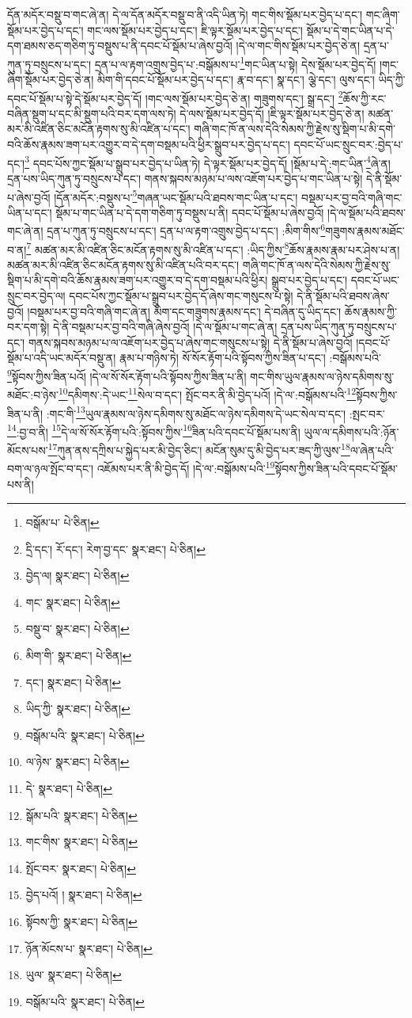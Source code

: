 དོན་མདོར་བསྡུ་བ་གང་ཞེ་ན། དེ་ལ་དོན་མདོར་བསྡུ་བ་ནི་འདི་ཡིན་ཏེ། གང་གིས་སྡོམ་པར་བྱེད་པ་དང་། གང་ཞིག་སྡོམ་པར་བྱེད་པ་དང་། གང་ལས་སྡོམ་པར་བྱེད་པ་དང་། ཇི་ལྟར་སྡོམ་པར་བྱེད་པ་དང་། སྡོམ་པ་དེ་གང་ཡིན་པ་དེ་དག་ཐམས་ཅད་གཅིག་ཏུ་བསྡུས་པ་ནི་དབང་པོ་སྡོམ་པ་ཞེས་བྱའོ། །དེ་ལ་གང་གིས་སྡོམ་པར་བྱེད་ཅེ་ན། དྲན་པ་ཀུན་ཏུ་བསྲུངས་པ་དང་། དྲན་པ་ལ་རྟག་འགྲུས་བྱེད་པ་:བསྒོམས་པ་\footnote{བསྒོམ་པ་  པེ་ཅིན། }གང་ཡིན་པ་སྟེ། དེས་སྡོམ་པར་བྱེད་དོ། །གང་ཞིག་སྡོམ་པར་བྱེད་ཅེ་ན། མིག་གི་དབང་པོ་སྡོམ་པར་བྱེད་པ་དང་། རྣ་བ་དང་། སྣ་དང་། ལྕེ་དང་། ལུས་དང་། ཡིད་ཀྱི་དབང་པོ་སྡོམ་པ་སྟེ་དེ་སྡོམ་པར་བྱེད་དོ། །གང་ལས་སྡོམ་པར་བྱེད་ཅེ་ན། གཟུགས་དང་། སྒྲ་དང་། \footnote{དྲི་དང་། རོ་དང་། རེག་བྱ་དང་  སྣར་ཐང་།  པེ་ཅིན། }ཆོས་ཀྱི་རང་བཞིན་སྡུག་པ་དང་མི་སྡུག་པའི་བར་དག་ལས་ཏེ། དེ་ལས་སྡོམ་པར་བྱེད་དོ། །ཇི་ལྟར་སྡོམ་པར་བྱེད་ཅེ་ན། མཚན་མར་མི་འཛིན་ཅིང་མངོན་རྟགས་སུ་མི་འཛིན་པ་དང་། གཞི་གང་ཁོ་ན་ལས་དེའི་སེམས་ཀྱི་རྗེས་སུ་སྡིག་པ་མི་དགེ་བའི་ཆོས་རྣམས་ཟག་པར་འགྱུར་བ་དེ་དག་བསྡམ་པའི་ཕྱིར་སྒྲུབ་པར་བྱེད་པ་དང་། དབང་པོ་ཡང་སྲུང་བར་:བྱེད་པ་དང་།\footnote{བྱེད་ལ།  སྣར་ཐང་།  པེ་ཅིན། } དབང་པོས་ཀྱང་སྡོམ་པ་སྒྲུབ་པར་བྱེད་པ་ཡིན་ཏེ། དེ་ལྟར་སྡོམ་པར་བྱེད་དོ། །སྡོམ་པ་དེ་:གང་ཡིན་\footnote{གང་  སྣར་ཐང་།  པེ་ཅིན། }ཞེ་ན། དྲན་པས་ཡིད་ཀུན་ཏུ་བསྲུངས་པ་དང་། གནས་སྐབས་མཉམ་པ་ལས་འཇོག་པར་བྱེད་པ་གང་ཡིན་པ་སྟེ། དེ་ནི་སྡོམ་པ་ཞེས་བྱའོ། །དོན་མདོར་:བསྡུས་པ་\footnote{བསྡུ་བ་  སྣར་ཐང་།  པེ་ཅིན། }གཞན་ཡང་སྡོམ་པའི་ཐབས་གང་ཡིན་པ་དང་། བསྡམ་པར་བྱ་བའི་གཞི་གང་ཡིན་པ་དང་། སྡོམ་པ་གང་ཡིན་པ་དེ་དག་གཅིག་ཏུ་བསྡུས་པ་ནི། དབང་པོ་སྡོམ་པ་ཞེས་བྱའོ། །དེ་ལ་སྡོམ་པའི་ཐབས་གང་ཞེ་ན། དྲན་པ་ཀུན་ཏུ་བསྲུངས་པ་དང་། དྲན་པ་ལ་རྟག་འགྲུས་བྱེད་པ་དང་། :མིག་གིས་\footnote{མིག་གི་  སྣར་ཐང་།  པེ་ཅིན། }གཟུགས་རྣམས་མཐོང་བ་ན།\footnote{དང་།  སྣར་ཐང་།  པེ་ཅིན། } མཚན་མར་མི་འཛིན་ཅིང་མངོན་རྟགས་སུ་མི་འཛིན་པ་དང་། :ཡིད་ཀྱིས་\footnote{ཡིད་ཀྱི་  སྣར་ཐང་།  པེ་ཅིན། }ཆོས་རྣམས་རྣམ་པར་ཤེས་པ་ན། མཚན་མར་མི་འཛིན་ཅིང་མངོན་རྟགས་སུ་མི་འཛིན་པའི་བར་དང་། གཞི་གང་ཁོ་ན་ལས་དེའི་སེམས་ཀྱི་རྗེས་སུ་སྡིག་པ་མི་དགེ་བའི་ཆོས་རྣམས་ཟག་པར་འགྱུར་བ་དེ་དག་བསྡམ་པའི་ཕྱིར། སྒྲུབ་པར་བྱེད་པ་དང་། དབང་པོ་ཡང་སྲུང་བར་བྱེད་ལ། དབང་པོས་ཀྱང་སྡོམ་པ་སྒྲུབ་པར་བྱེད་དོ་ཞེས་གང་གསུངས་པ་སྟེ། དེ་ནི་སྡོམ་པའི་ཐབས་ཞེས་བྱའོ། །བསྡམ་པར་བྱ་བའི་གཞི་གང་ཞེ་ན། མིག་དང་གཟུགས་རྣམས་དང་། དེ་བཞིན་དུ་ཡིད་དང་། ཆོས་རྣམས་ཀྱི་བར་དག་སྟེ། དེ་ནི་བསྡམ་པར་བྱ་བའི་གཞི་ཞེས་བྱའོ། །དེ་ལ་སྡོམ་པ་གང་ཞེ་ན། དྲན་པས་ཡིད་ཀུན་ཏུ་བསྲུངས་པ་དང་། གནས་སྐབས་མཉམ་པ་ལ་འཇོག་པར་བྱེད་པ་ཞེས་གང་གསུངས་པ་སྟེ། དེ་ནི་སྡོམ་པ་ཞེས་བྱའོ། །དབང་པོ་སྡོམ་པ་འདི་ཡང་མདོར་བསྡུ་ན། རྣམ་པ་གཉིས་ཏེ། སོ་སོར་རྟོག་པའི་སྟོབས་ཀྱིས་ཟིན་པ་དང་། :བསྒོམས་པའི་\footnote{བསྒོམ་པའི་  སྣར་ཐང་།  པེ་ཅིན། }སྟོབས་ཀྱིས་ཟིན་པའོ། །དེ་ལ་སོ་སོར་རྟོག་པའི་སྟོབས་ཀྱིས་ཟིན་པ་ནི། གང་གིས་ཡུལ་རྣམས་ལ་ཉེས་དམིགས་སུ་མཐོང་:བ་ཉེས་\footnote{ལ་ཉེས་  སྣར་ཐང་།  པེ་ཅིན། }དམིགས་:དེ་ཡང་\footnote{དེ་  སྣར་ཐང་།  པེ་ཅིན། }སེལ་བ་དང་། སྤོང་བར་ནི་མི་བྱེད་པའོ། །དེ་ལ་:བསྒོམས་པའི་\footnote{སྒོམ་པའི་  སྣར་ཐང་།  པེ་ཅིན། }སྟོབས་ཀྱིས་ཟིན་པ་ནི། :གང་གི་\footnote{གང་གིས་  སྣར་ཐང་།  པེ་ཅིན། }ཡུལ་རྣམས་ལ་ཉེས་དམིགས་སུ་མཐོང་ལ་ཉེས་དམིགས་དེ་ཡང་སེལ་བ་དང་། :སྤང་བར་\footnote{སྤོང་བར་  སྣར་ཐང་།  པེ་ཅིན། }:བྱ་བ་ནི། \footnote{བྱེད་པའོ། །   སྣར་ཐང་།  པེ་ཅིན། }དེ་ལ་སོ་སོར་རྟོག་པའི་:སྟོབས་ཀྱིས་\footnote{སྟོབས་ཀྱི་  སྣར་ཐང་།  པེ་ཅིན། }ཟིན་པའི་དབང་པོ་སྡོམ་པས་ནི། ཡུལ་ལ་དམིགས་པའི་:ཉོན་མོངས་པས་\footnote{ཉོན་མོངས་པ་  སྣར་ཐང་།  པེ་ཅིན། }ཀུན་ནས་དཀྲིས་པ་སྐྱེད་པར་མི་བྱེད་ཅིང་། མངོན་སུམ་དུ་མི་བྱེད་པར་ཟད་ཀྱི་ལུས་\footnote{ཡུལ་  སྣར་ཐང་།  པེ་ཅིན། }ལ་ཞེན་པའི་བག་ལ་ཉལ་སྤོང་བ་དང་། འཇོམས་པར་ནི་མི་བྱེད་དོ། །དེ་ལ་:བསྒོམས་པའི་\footnote{བསྒོམ་པའི་  སྣར་ཐང་།  པེ་ཅིན། }སྟོབས་ཀྱིས་ཟིན་པའི་དབང་པོ་སྡོམ་པས་ནི། 